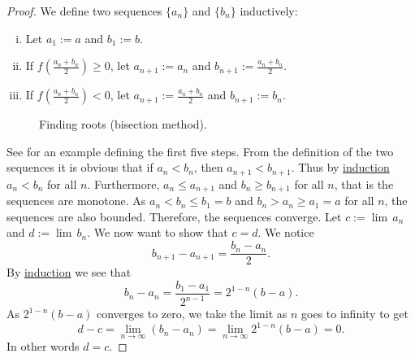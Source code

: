 \documentclass[12pt]{book}
\begin{document}
\begin{proof}
We define two sequences $\{ a_n \}$
and $\{ b_n \}$ inductively:
\begin{enumerate}[(i)]
\item Let $a_1 := a$ and $b_1 := b$.
\item If $f\left(\frac{a_n+b_n}{2}\right) \geq 0$, let $a_{n+1} := a_n$ and
$b_{n+1} := \frac{a_n+b_n}{2}$.
\item If $f\left(\frac{a_n+b_n}{2}\right) < 0$, let $a_{n+1} := \frac{a_n+b_n}{2}$ and
$b_{n+1} := b_n$.
\end{enumerate}
\begin{figure}[h!t]
\begin{center}

\caption{Finding roots (bisection method).\label{bisectfig}}
\end{center}
\end{figure}
See  for an example defining the first five steps.
From the definition of the two sequences it is obvious that if $a_n < b_n$,
then $a_{n+1} < b_{n+1}$.
Thus by \hyperref[induction:thm]{induction} $a_n < b_n$ for all $n$.
Furthermore, $a_n \leq a_{n+1}$ and 
$b_n \geq b_{n+1}$ for all $n$, that is the sequences are monotone.
As $a_n < b_n \leq b_1 = b$ and 
$b_n > a_n \geq a_1 = a$ for all $n$,
the sequences are also bounded.
Therefore, the
sequences converge.
Let $c := \lim\, a_n$ and $d := \lim\, b_n$.
We now
want to show that $c=d$.
We notice
\begin{equation*}
b_{n+1} - a_{n+1} = \frac{b_n-a_n}{2}.
\end{equation*}
By \hyperref[induction:thm]{induction} we see that
\begin{equation*}
b_n - a_n = \frac{b_1-a_1}{2^{n-1}} = 2^{1-n} (b-a) .
\end{equation*}
As $2^{1-n}(b-a)$ converges to zero, we take the limit as $n$ goes to
infinity to get
\begin{equation*}
d-c = \lim_{n\to\infty} (b_n - a_n) =
\lim_{n\to\infty} 2^{1-n} (b-a) = 0.
\end{equation*}
In other words $d=c$.



\end{proof}
\end{document}
